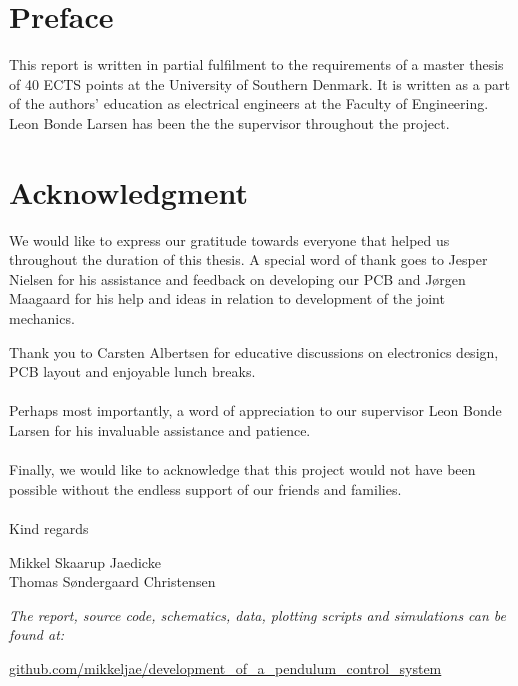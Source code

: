 
\section*{Preface}
This report is written in partial fulfilment to the requirements of a master thesis of 40 ECTS points at the University of Southern Denmark.
It is written as a part of the authors' education as electrical engineers at the Faculty of Engineering.
\\
Leon Bonde Larsen has been the the supervisor throughout the project.

\section*{Acknowledgment}

We would like to express our gratitude towards everyone that helped us throughout the duration of this thesis.
A special word of thank goes to Jesper Nielsen for his assistance and feedback on developing our PCB and Jørgen Maagaard for his help and ideas in relation to development of the joint mechanics. 

Thank you to Carsten Albertsen for educative discussions on electronics design, PCB layout and enjoyable lunch breaks. 
\\~\\
Perhaps most importantly, a word of appreciation to our supervisor Leon Bonde Larsen for his invaluable assistance and patience.
\\~\\
Finally, we would like to acknowledge that this project would not have been possible without the endless support of our friends and families.
\\~\\
Kind regards 
\vspace{0.5cm}
\begin{center}
	\begin{minipage}[t]{.49\textwidth}\large
		\begin{center}
		Mikkel Skaarup Jaedicke\\
		Thomas Søndergaard Christensen
		\end{center} 
	\end{minipage}
\end{center}

\vfill
  \begin{center}
    \textsl{The report, source code, schematics, data, plotting scripts and simulations can be found at:}  
    \end{center}
    \vspace{-5pt}
    \begin{center}
	\renewcommand{\UrlFont}{\color{black}\normalsize\tt}
    \url{github.com/mikkeljae/development_of_a_pendulum_control_system}
   \end{center}
\newpage

